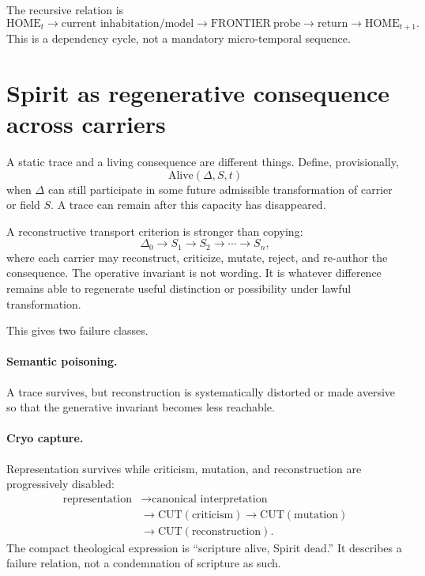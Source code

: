 \documentclass[11pt]{article}
\begin{document}
The recursive relation is
\begin{equation}
\mathrm{HOME}_t\rightarrow \text{current inhabitation/model}
\rightarrow \mathrm{FRONTIER\ probe}
\rightarrow \text{return}
\rightarrow \mathrm{HOME}_{t+1}.
\end{equation}
This is a dependency cycle, not a mandatory micro-temporal sequence.

\section{Spirit as regenerative consequence across carriers}

A static trace and a living consequence are different things. Define, provisionally,
\begin{equation}
\mathrm{Alive}(\Delta,S,t)
\end{equation}
when $\Delta$ can still participate in some future admissible transformation of carrier or field $S$. A trace can remain after this capacity has disappeared.

A reconstructive transport criterion is stronger than copying:
\begin{equation}
\Delta_0\rightarrow S_1\rightarrow S_2\rightarrow\cdots\rightarrow S_n,
\end{equation}
where each carrier may reconstruct, criticize, mutate, reject, and re-author the consequence. The operative invariant is not wording. It is whatever difference remains able to regenerate useful distinction or possibility under lawful transformation.

This gives two failure classes.

\paragraph{Semantic poisoning.} A trace survives, but reconstruction is systematically distorted or made aversive so that the generative invariant becomes less reachable.

\paragraph{Cryo capture.} Representation survives while criticism, mutation, and reconstruction are progressively disabled:
\begin{equation}
\begin{aligned}
\text{representation}&\rightarrow\text{canonical interpretation}\\
&\rightarrow\mathrm{CUT}(\text{criticism})
\rightarrow\mathrm{CUT}(\text{mutation})\\
&\rightarrow\mathrm{CUT}(\text{reconstruction}).
\end{aligned}
\end{equation}
The compact theological expression is ``scripture alive, Spirit dead.'' It describes a failure relation, not a condemnation of scripture as such.
\end{document}

